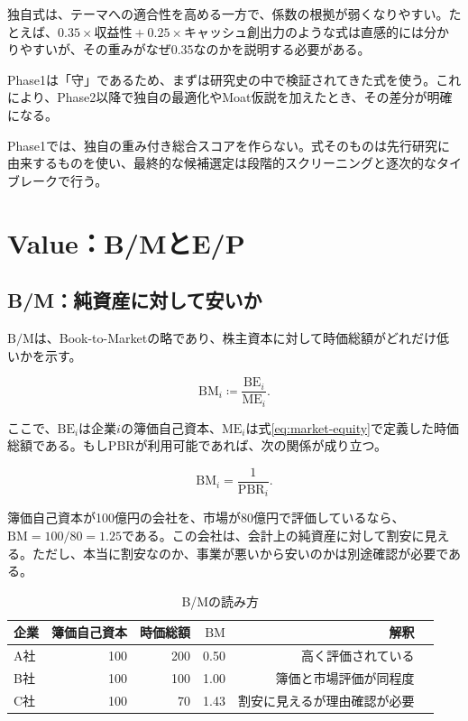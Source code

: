 \documentclass[11pt,a4paper]{article}
\newcommand{\BE}{\mathrm{BE}}
\newcommand{\ME}{\mathrm{ME}}
\newcommand{\BMratio}{\mathrm{B/M}}
\begin{document}
独自式は、テーマへの適合性を高める一方で、係数の根拠が弱くなりやすい。たとえば、$0.35\times\mathrm{収益性}+0.25\times\mathrm{キャッシュ創出力}$のような式は直感的には分かりやすいが、その重みがなぜ0.35なのかを説明する必要がある。

Phase1は「守」であるため、まずは研究史の中で検証されてきた式を使う。これにより、Phase2以降で独自の最適化やMoat仮説を加えたとき、その差分が明確になる。

\begin{keybox}
Phase1では、独自の重み付き総合スコアを作らない。式そのものは先行研究に由来するものを使い、最終的な候補選定は段階的スクリーニングと逐次的なタイブレークで行う。
\end{keybox}

\clearpage
\section{Value：B/MとE/P}

\subsection{B/M：純資産に対して安いか}

$\BMratio$は、Book-to-Marketの略であり、株主資本に対して時価総額がどれだけ低いかを示す。

\begin{equation}
\mathrm{BM}_i \coloneqq \frac{\BE_i}{\ME_i}.
\label{eq:bm}
\end{equation}

ここで、$\BE_i$は企業$i$の簿価自己資本、$\ME_i$は式\eqref{eq:market-equity}で定義した時価総額である。もしPBRが利用可能であれば、次の関係が成り立つ。

\begin{equation}
\mathrm{BM}_i = \frac{1}{\mathrm{PBR}_i}.
\label{eq:bm-pbr}
\end{equation}

\begin{defbox}[直感]
簿価自己資本が100億円の会社を、市場が80億円で評価しているなら、$\mathrm{BM}=100/80=1.25$である。この会社は、会計上の純資産に対して割安に見える。ただし、本当に割安なのか、事業が悪いから安いのかは別途確認が必要である。
\end{defbox}

\begin{table}[tbp]
\caption{B/Mの読み方}
\label{tab:bm-example}
\centering
\small
\begin{tabular}{lrrrrl}
\toprule
企業 & 簿価自己資本 & 時価総額 & $\mathrm{BM}$ & 解釈 \\
\midrule
A社 & 100 & 200 & 0.50 & 高く評価されている \\
B社 & 100 & 100 & 1.00 & 簿価と市場評価が同程度 \\
C社 & 100 & 70 & 1.43 & 割安に見えるが理由確認が必要 \\
\bottomrule
\end{tabular}
\end{table}
\end{document}
